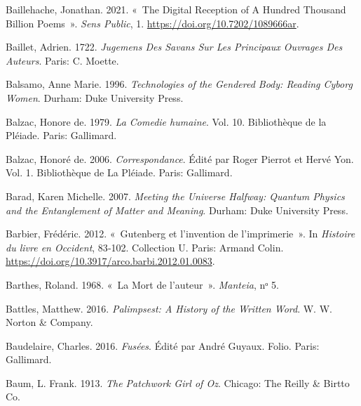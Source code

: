 \begin{CSLReferences}{1}{0}
\leavevmode{}%
Baillehache, Jonathan. 2021. {«~The {Digital Reception} of {A Hundred
Thousand Billion Poems}~»}. \emph{Sens Public}, 1.
\url{https://doi.org/10.7202/1089666ar}.

\leavevmode{}%
Baillet, Adrien. 1722. \emph{Jugemens Des Savans Sur Les Principaux
Ouvrages Des Auteurs}. {Paris}: {C. Moette}.

\leavevmode{}%
Balsamo, Anne Marie. 1996. \emph{Technologies of the {Gendered Body}:
{Reading Cyborg Women}}. {Durham}: {Duke University Press}.

\leavevmode{}%
Balzac, Honore de. 1979. \emph{{La Comedie humaine}}. Vol. 10.
{Biblioth{è}que de la Pl{é}iade}. {Paris}: {Gallimard}.

\leavevmode{}%
Balzac, Honoré de. 2006. \emph{Correspondance}. Édité par Roger Pierrot
et Hervé Yon. Vol. 1. Biblioth{è}que de La {Pl{é}iade}. {Paris}:
{Gallimard}.

\leavevmode{}%
Barad, Karen Michelle. 2007. \emph{Meeting the {Universe Halfway}:
{Quantum Physics} and the {Entanglement} of {Matter} and {Meaning}}.
{Durham}: {Duke University Press}.

\leavevmode{}%
Barbier, Frédéric. 2012. {«~{Gutenberg et l'invention de
l'imprimerie}~»}. In \emph{{Histoire du livre en Occident}}, 83‑102.
{Collection U}. {Paris}: {Armand Colin}.
\url{https://doi.org/10.3917/arco.barbi.2012.01.0083}.

\leavevmode{}%
Barthes, Roland. 1968. {«~La Mort de l'auteur~»}. \emph{Manteia}, nᵒ 5.

\leavevmode{}%
Battles, Matthew. 2016. \emph{Palimpsest: {A History} of the {Written
Word}}. {W. W. Norton \& Company}.

\leavevmode{}%
Baudelaire, Charles. 2016. \emph{{Fus{é}es}}. Édité par André Guyaux.
{Folio}. {Paris}: {Gallimard}.

\leavevmode{}%
Baum, L. Frank. 1913. \emph{The {Patchwork Girl} of {Oz}}. {Chicago}:
{The Reilly \& Birtto Co.}


\end{CSLReferences}
